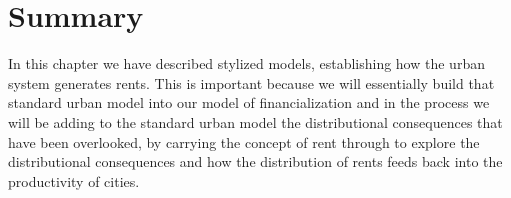 


\section{Summary}
In this chapter we have described
stylized models, establishing how the urban system generates rents. %
This is important because we will essentially build that standard urban model into our model of financialization and in the process we will be adding to the standard urban model the distributional consequences that have been overlooked, by carrying the concept of rent through to explore the distributional consequences and how the distribution of rents feeds back into the productivity of cities. 

